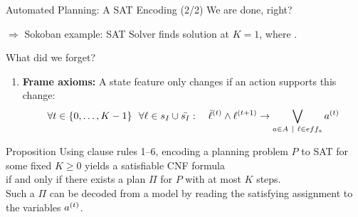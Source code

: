 \documentclass[t,english]{sdqbeamer}
\begin{document}
\begin{frame}{Automated Planning: A SAT Encoding (2/2)}
	We are done, right?
	\pause
	
	$\Rightarrow$ Sokoban example: SAT Solver finds solution at $K=1$, where .

	What did we forget?
	\vspace*{4mm}
	\pause

	\begin{enumerate}
		\item[6.] \textbf{Frame axioms:} A state feature only changes if an action supports this change:
		\[ \forall t \in \{0,\ldots,K-1\}~~\forall \ell \in s_I \cup \bar{s_I} :\quad {\bar{\ell}}^{(t)} \wedge {\ell}^{(t+1)} \rightarrow \bigvee_{a \in A\ |\ \ell \in eff_a} {a}^{(t)} \]
	\end{enumerate}
	
	\pause
	\begin{blueblock}{Proposition}
		Using clause rules 1--6, encoding a planning problem $P$ to SAT for some fixed $K\geq 0$ yields a satisfiable CNF formula\\
		if and only if there exists a plan $\Pi$ for $P$ with at most $K$ steps.
		\\
		Such a $\Pi$ can be decoded from a model by reading the satisfying assignment to the variables ${a}^{(t)}$.
	\end{blueblock}
\end{frame}
\end{document}

